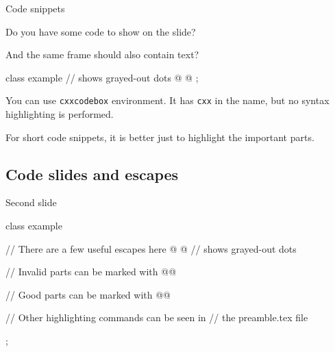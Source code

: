 \begin{xframe}{Code snippets}

    Do you have some code to show on the slide?

    And the same frame should also contain text?

    \begin{cxxcodebox}
        class example {
            // \codedots shows grayed-out dots
            @ \codedots @
        };
    \end{cxxcodebox}

    You can use \verb|cxxcodebox| environment.
    It has \verb|cxx| in the name,
    but no syntax highlighting is performed.

    For short code snippets,
    it is better just to highlight the important parts.

\end{xframe}


\subsection{Code slides and escapes}

\begin{xframe}{Second slide}

    \begin{cxxcode}
        class example {
            // There are a few useful escapes here
            @ \codedots @ // \codedots shows grayed-out dots

            // Invalid parts can be marked with \hlErr
            @@

            // Good parts can be marked with \hlOk
            @@

            // Other highlighting commands can be seen in
            // the preamble.tex file
        };
    \end{cxxcode}

\end{xframe}


